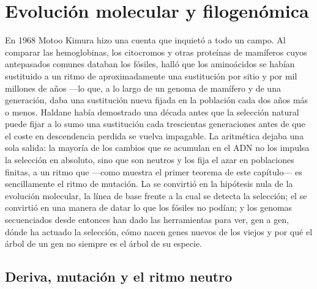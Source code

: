 \chapter{Evolución molecular y filogenómica}\label{ch:b3:molecular-evolution}

En 1968 Motoo Kimura hizo una cuenta que inquietó a todo un campo. Al
comparar las hemoglobinas, los citocromos y otras proteínas de
mamíferos cuyos antepasados comunes databan los fósiles, halló que los
aminoácidos se habían sustituido a un ritmo de aproximadamente una
sustitución por sitio y por mil millones de años ---lo que, a lo largo
de un genoma de mamífero y de una generación, daba una sustitución
nueva fijada en la población cada dos años más o menos. Haldane había
demostrado una década antes que la selección natural puede fijar a lo
sumo una sustitución cada trescientas generaciones antes de que el
coste en descendencia perdida se vuelva impagable. La aritmética
dejaba una sola salida: la mayoría de los cambios que se acumulan en el
ADN no los impulsa la selección en absoluto, sino que son neutros y los
fija el azar en poblaciones finitas, a un ritmo que ---como muestra el
primer teorema de este capítulo--- es sencillamente el ritmo de
mutación. La  se convirtió en la hipótesis nula de la
evolución molecular, la línea de base frente a la cual se detecta la
selección; el  se convirtió en una manera de datar lo
que los fósiles no podían; y los genomas secuenciados desde entonces
han dado las herramientas para ver, gen a gen, dónde ha actuado la
selección, cómo nacen genes nuevos de los viejos y por qué el árbol de
un gen no siempre es el árbol de su especie.

\section{Deriva, mutación y el ritmo neutro}

